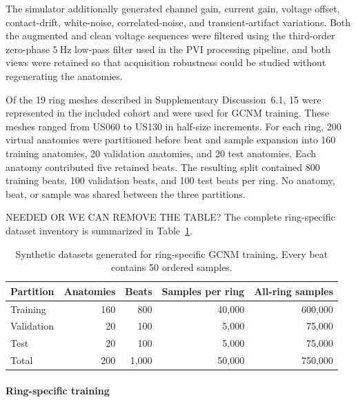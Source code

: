 \documentclass[11pt]{article}
\begin{document}
The simulator additionally generated channel gain, current gain, voltage offset, contact-drift, white-noise, correlated-noise, and transient-artifact variations.
Both the augmented and clean voltage sequences were filtered using the third-order zero-phase $5~\mathrm{Hz}$ low-pass filter used in the PVI processing pipeline, and both views were retained so that acquisition robustness could be studied without regenerating the anatomies.

Of the 19 ring meshes described in Supplementary Discussion~6.1, 15 were represented in the included cohort and were used for GCNM training.
These meshes ranged from US060 to US130 in half-size increments.
For each ring, 200 virtual anatomies were partitioned before beat and sample expansion into 160 training anatomies, 20 validation anatomies, and 20 test anatomies.
Each anatomy contributed five retained beats.
The resulting split contained 800 training beats, 100 validation beats, and 100 test beats per ring.
No anatomy, beat, or sample was shared between the three partitions.

\color{red}
NEEDED OR WE CAN REMOVE THE TABLE?
The complete ring-specific dataset inventory is summarized in Table~\ref{tab:gcnm-synthetic-inventory}.

\begin{table}[htbp]
    
    \centering
    \caption{Synthetic datasets generated for ring-specific GCNM training.
    Every beat contains 50 ordered samples.}
    \label{tab:gcnm-synthetic-inventory}
    \small
    \begin{tabular}{lrrrr}
        \hline
        Partition & Anatomies & Beats & Samples per ring & All-ring samples \\
        \hline
        Training & 160 & 800 & 40,000 & 600,000 \\
        Validation & 20 & 100 & 5,000 & 75,000 \\
        Test & 20 & 100 & 5,000 & 75,000 \\
        \hline
        Total & 200 & 1,000 & 50,000 & 750,000 \\
        \hline
    \end{tabular}
\end{table}

\clearpage
\color{black}

\paragraph{Ring-specific training}
\label{sec:gcnm-ring-training}
\mbox{}\par
\color{red}
\end{document}
